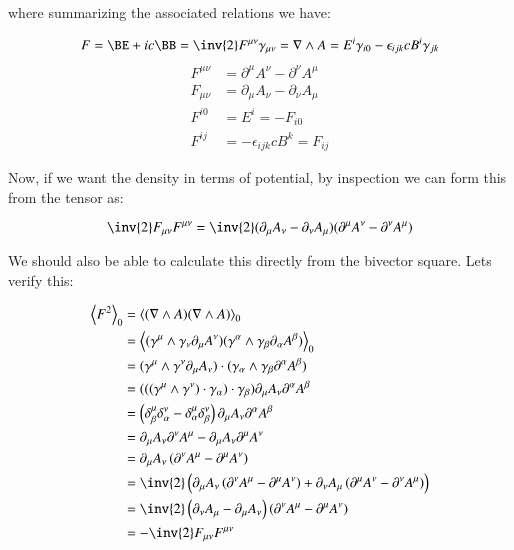 \documentclass{article}
\newcommand{\gpgrade}[2] {{\left\langle{{#1}}\right\rangle}_{#2}}
\newcommand{\gpgradezero}[1] {\gpgrade{#1}{0}}
\newcommand{\grad}[0]{\nabla}
\begin{document}
where summarizing the associated relations we have:

\begin{equation*}
F = \BE + i c \BB = \inv{2} F^{\mu\nu} \gamma_{\mu\nu} = \grad \wedge A = E^i \gamma_{i 0} - \epsilon_{i j k} c B^i \gamma_{j k}
\end{equation*}
\begin{align*}
F^{\mu\nu} &= \partial^{\mu} A^{\nu} - \partial^{\nu} A^{\mu} \\
F_{\mu\nu} &= \partial_{\mu} A_{\nu} - \partial_{\nu} A_{\mu} \\
F^{i0} &= E^i = -F_{i0} \\
F^{ij} &= -\epsilon_{i j k} c B^k = F_{ij}
\end{align*}

Now, if we want the density in terms of potential, by inspection we can form this from the tensor as:

\begin{equation*}
\inv{2} F_{\mu\nu}F^{\mu\nu} = \inv{2} (\partial_{\mu} A_{\nu} - \partial_{\nu} A_{\mu} ) (\partial^{\mu} A^{\nu} - \partial^{\nu} A^{\mu} )
\end{equation*}

We should also be able to calculate this directly from the bivector square.  Lets verify this:

\begin{align*}
\gpgradezero{ F^2 }
&= \gpgradezero{ (\grad \wedge A)(\grad \wedge A) } \\
&= \gpgradezero{ (\gamma^{\mu} \wedge \gamma_{\nu} \partial_{\mu} A^{\nu}) (\gamma^{\alpha} \wedge \gamma_{\beta} \partial_{\alpha} A^{\beta}) } \\
&= (\gamma^{\mu} \wedge \gamma^{\nu} \partial_{\mu} A_{\nu}) \cdot (\gamma_{\alpha} \wedge \gamma_{\beta} \partial^{\alpha} A^{\beta}) \\
&= ( ( (\gamma^{\mu} \wedge \gamma^{\nu}) \cdot \gamma_{\alpha} ) \cdot \gamma_{\beta} ) \partial_{\mu} A_{\nu} \partial^{\alpha} A^{\beta} \\
&= \left( \delta^{\mu}_{\beta} \delta^{\nu}_{\alpha} - \delta^{\mu}_{\alpha} \delta^{\nu}_{\beta} \right) \partial_{\mu} A_{\nu} \partial^{\alpha} A^{\beta} \\
&= \partial_{\mu} A_{\nu} \partial^{\nu} A^{\mu} - \partial_{\mu} A_{\nu} \partial^{\mu} A^{\nu} \\
&= \partial_{\mu} A_{\nu} \left( \partial^{\nu} A^{\mu} - \partial^{\mu} A^{\nu} \right) \\
&= 
\inv{2} \left( \partial_{\mu} A_{\nu} \left( \partial^{\nu} A^{\mu} - \partial^{\mu} A^{\nu} \right) 
+\partial_{\nu} A_{\mu} \left( \partial^{\mu} A^{\nu} - \partial^{\nu} A^{\mu} \right) \right)
\\
&= \inv{2} \left( \partial_{\nu} A_{\mu} - \partial_{\mu} A_{\nu} \right) \left( \partial^{\nu} A^{\mu} - \partial^{\mu} A^{\nu} \right) \\
&= -\inv{2} F_{\mu\nu}F^{\mu\nu}
\end{align*}
\end{document}

